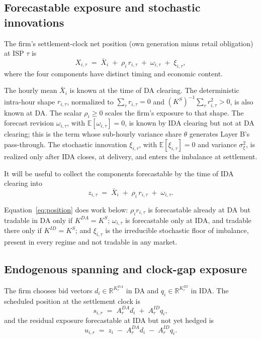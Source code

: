 \documentclass[11pt]{article}
\begin{document}
\subsection{Forecastable exposure and stochastic innovations}
\label{sec:model-exposure}

The firm's settlement-clock net position (own generation minus retail obligation) at ISP $\tau$ is
\begin{equation}
X_{i,\tau} \;=\; \bar{X}_{i} \;+\; \rho_{i}\, r_{i,\tau} \;+\; \omega_{i,\tau} \;+\; \xi_{i,\tau},
\label{eq:position}
\end{equation}
where the four components have distinct timing and economic content.

The hourly mean $\bar{X}_{i}$ is known at the time of DA clearing. The deterministic intra-hour shape $r_{i,\tau}$, normalized to $\sum_{\tau} r_{i,\tau} = 0$ and $(K^{S})^{-1}\sum_{\tau} r_{i,\tau}^{2} > 0$, is also known at DA. The scalar $\rho_{i} \ge 0$ scales the firm's exposure to that shape. The forecast revision $\omega_{i,\tau}$, with $\mathbb{E}[\omega_{i,\tau}] = 0$, is known by IDA clearing but not at DA clearing; this is the term whose sub-hourly variance share $\theta$ generates Layer B's pass-through. The stochastic innovation $\xi_{i,\tau}$, with $\mathbb{E}[\xi_{i,\tau}] = 0$ and variance $\sigma^{2}_{\xi}$, is realized only after IDA closes, at delivery, and enters the imbalance at settlement.

It will be useful to collect the components forecastable by the time of IDA clearing into
\begin{equation}
z_{i,\tau} \;=\; \bar{X}_{i} \;+\; \rho_{i}\, r_{i,\tau} \;+\; \omega_{i,\tau}.
\end{equation}

Equation~\eqref{eq:position} does work below: $\rho_{i} r_{i,\tau}$ is forecastable already at DA but tradable in DA only if $K^{DA} = K^{S}$; $\omega_{i,\tau}$ is forecastable only at IDA, and tradable there only if $K^{ID} = K^{S}$; and $\xi_{i,\tau}$ is the irreducible stochastic floor of imbalance, present in every regime and not tradable in any market.

\subsection{Endogenous spanning and clock-gap exposure}
\label{sec:model-spanning}

The firm chooses bid vectors $d_{i} \in \mathbb{R}^{K^{DA}_r}$ in DA and $q_{i} \in \mathbb{R}^{K^{ID}_r}$ in IDA. The scheduled position at the settlement clock is
\begin{equation}
s_{i,r} \;=\; A^{DA}_r d_{i} \;+\; A^{ID}_r q_{i},
\end{equation}
and the residual exposure forecastable at IDA but not yet hedged is
\begin{equation}
u_{i,r} \;=\; z_{i} \;-\; A^{DA}_r d_{i} \;-\; A^{ID}_r q_{i}.
\end{equation}
\end{document}
